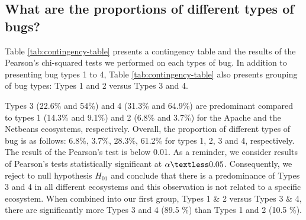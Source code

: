 
\subsection{What are the proportions of different types of bugs?}



Table \ref{tab:contingency-table} presents a contingency table and the results of the Pearson's chi-squared tests we performed on each types of bug.
In addition to presenting bug types 1 to 4,  Table \ref{tab:contingency-table} also presents grouping of bug types:
Types 1 and 2 versus Types 3 and 4.

Types 3 (22.6\% and 54\%) and 4 (31.3\% and 64.9\%) are predominant compared to types 1 (14.3\% and 9.1\%) and 2 (6.8\% and 3.7\%) for the Apache and the Netbeans ecosystems, respectively.
Overall, the proportion of different types of bug is as follows: 6.8\%, 3.7\%, 28.3\%, 61.2\% for types 1, 2, 3 and 4, respectively.
The result of the Pearson's test is below 0.01.
As a reminder, we consider results of Pearson's tests statistically significant at $\alpha \textless0.05$.
Consequently, we reject to null hypothesis $H_{01}$ and conclude that there is a predominance of Types 3 and 4 in all different ecosystems and this observation is not related to a specific ecosystem.
When combined into our first group, Types 1 \& 2 versus Types 3 \& 4, there are significantly more Types 3 and 4 (89.5 \%) than Types 1 and 2 (10.5 \%).
